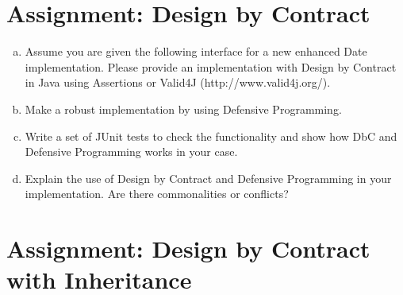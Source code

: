 \documentclass[a4paper,12pt,oneside]{scrreprt}
\newcommand*{\sourcepath}{../code/src/main/java/de/rwth/swc/group10}
\begin{document}
\section{Assignment: Design by Contract}


\begin{enumerate}[a)]
	\item Assume you are given the following interface for a new enhanced Date
	implementation. Please provide an implementation with Design by Contract in Java 	using Assertions or Valid4J (http://www.valid4j.org/).\\
	
	
	\item Make a robust implementation by using Defensive Programming.
	
	\item  Write a set of JUnit tests to check the functionality and show how DbC and Defensive Programming works in your case.
	
	\item Explain the use of Design by Contract and Defensive Programming in your
	implementation. Are there commonalities or conflicts?
\end{enumerate}

\section{Assignment: Design by Contract with Inheritance}
\end{document}
